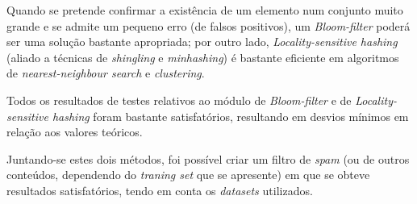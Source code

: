 \documentclass[a4paper,11pt,openright,oneside]{report}
\begin{document}
Quando se pretende confirmar a existência de um elemento num conjunto muito grande e se admite um pequeno erro (de falsos positivos), um \textit{Bloom-filter} poderá ser uma solução bastante apropriada; por outro lado, \textit{Locality-sensitive hashing} (aliado a técnicas de \textit{shingling} e \textit{minhashing}) é bastante eficiente em algoritmos de \textit{nearest-neighbour search} e \textit{clustering}.

Todos os resultados de testes relativos ao módulo de \textit{Bloom-filter} e de \textit{Locality-sensitive hashing} foram bastante satisfatórios, resultando em desvios mínimos em relação aos valores teóricos.

Juntando-se estes dois métodos, foi possível criar um filtro de \textit{spam} (ou de outros conteúdos, dependendo do \textit{traning set} que se apresente) em que se obteve resultados satisfatórios, tendo em conta os \textit{datasets} utilizados.

\maketitle
\nocite{*}

\printbibliography[title={Referências}]
\end{document}
